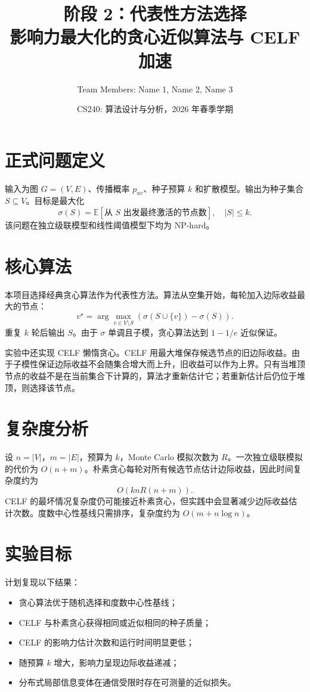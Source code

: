 \documentclass[UTF8, 11pt]{ctexart}
\title{\textbf{阶段 2：代表性方法选择}\\
影响力最大化的贪心近似算法与 CELF 加速}
\author{Team Members: Name 1, Name 2, Name 3}
\date{CS240: 算法设计与分析，2026 年春季学期}
\begin{document}
\maketitle

\section{正式问题定义}

输入为图 $G=(V,E)$、传播概率 $p_{uv}$、种子预算 $k$ 和扩散模型。输出为种子集合 $S\subseteq V$。目标是最大化
\[
    \sigma(S)=\mathbb{E}[\text{从 }S\text{ 出发最终激活的节点数}],
    \quad |S|\leq k.
\]
该问题在独立级联模型和线性阈值模型下均为 NP-hard。

\section{核心算法}

本项目选择经典贪心算法作为代表性方法。算法从空集开始，每轮加入边际收益最大的节点：
\[
    v^\star =
    \arg\max_{v\in V\setminus S}
    \left(\sigma(S\cup\{v\})-\sigma(S)\right).
\]
重复 $k$ 轮后输出 $S$。由于 $\sigma$ 单调且子模，贪心算法达到 $1-1/e$ 近似保证。

实验中还实现 CELF 懒惰贪心。CELF 用最大堆保存候选节点的旧边际收益。由于子模性保证边际收益不会随集合增大而上升，旧收益可以作为上界。只有当堆顶节点的收益不是在当前集合下计算的，算法才重新估计它；若重新估计后仍位于堆顶，则选择该节点。

\section{复杂度分析}

设 $n=|V|$，$m=|E|$，预算为 $k$，Monte Carlo 模拟次数为 $R$。一次独立级联模拟的代价为 $O(n+m)$。朴素贪心每轮对所有候选节点估计边际收益，因此时间复杂度约为
\[
    O(k n R (n+m)).
\]
CELF 的最坏情况复杂度仍可能接近朴素贪心，但实践中会显著减少边际收益估计次数。度数中心性基线只需排序，复杂度约为 $O(m+n\log n)$。

\section{实验目标}

计划复现以下结果：
\begin{itemize}
    \item 贪心算法优于随机选择和度数中心性基线；
    \item CELF 与朴素贪心获得相同或近似相同的种子质量；
    \item CELF 的影响力估计次数和运行时间明显更低；
    \item 随预算 $k$ 增大，影响力呈现边际收益递减；
    \item 分布式局部信息变体在通信受限时存在可测量的近似损失。
\end{itemize}
\end{document}
